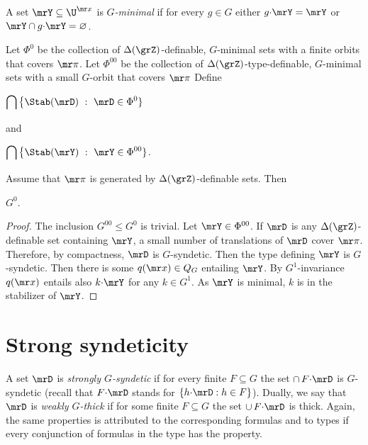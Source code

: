 A set $\mrY\subseteq\U^{\mr x}$ is \emph{$G$-minimal\/} if for every $g\in G$ either $g{\cdot}\mrY=\mrY$ or $\mrY\cap g{\cdot}\mrY=\varnothing$.

\begin{definition}\label{def_G00}
  Let $\Phi^0$ be the collection of $\Delta(\grZ)$-definable, $G$-minimal sets with a finite orbits that covers ${\mr\pi}$.
  Let $\Phi^{00}$ be the collection of $\Delta(\grZ)$-type-definable, $G$-minimal sets with a small $G$-orbit that covers ${\mr\pi}$
  Define\smallskip

  \medrel{=}$\displaystyle\bigcap\big\{\Stab(\mrD)\ :\  \mrD\in\Phi^0\}$

  and

  \medrel{=}$\displaystyle\bigcap\big\{\Stab(\mrY)\ :\  \mrY\in\Phi^{00}\}$.

\end{definition}

\begin{proposition}
  Assume that ${\mr\pi}$ is generated by $\Delta(\grZ)$-definable sets.
  Then 
  
  \medrel{\leq}$G^0$.
\end{proposition}

\begin{proof}
  The inclusion $G^{00}\leq G^0$ is trivial.
  Let $\mrY\in\Phi^{00}$.
  If $\mrD$ is any $\Delta(\grZ)$-definable set containing $\mrY$, a small number of translations of $\mrD$ cover ${\mr\pi}$.
  Therefore, by compactness, $\mrD$ is $G$-syndetic.
  Then the type defining $\mrY$ is $G$-syndetic.
  Then there is some $q({\mr x})\in Q_G$ entailing $\mrY$.
  By $G^1$-invariance $q({\mr x})$ entails also $k{\cdot}\mrY$ for any $k\in G^1$.
  As $\mrY$ is minimal, $k$ is in the stabilizer of $\mrY$.
\end{proof}

\section{Strong syndeticity}\label{strong_syndeticity}

A set $\mrD$ is \emph{strongly $G$-syndetic\/} if for every finite $F\subseteq G$ the set $\cap\,F{\cdot}\mrD$ is $G$-syndetic (recall that $F{\cdot}\mrD$ stands for $\{h{\cdot}\mrD : h\in F\}$).
Dually, we say that $\mrD$ is \emph{weakly $G$-thick\/} if for some finite $F\subseteq G$ the set $\cup\,F{\cdot}\mrD$ is thick.
Again, the same properties is attributed to the corresponding formulas and to types if every conjunction of formulas in the type has the property.

